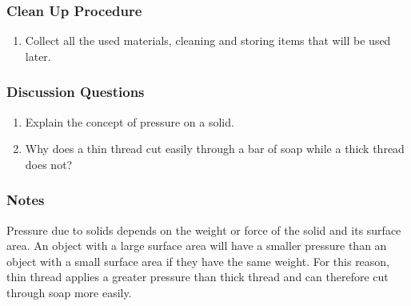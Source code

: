 \subsubsection*{Clean Up Procedure}
\begin{enumerate}
\item{Collect all the used materials, cleaning and storing items that will be used later.} 
\end{enumerate}

\subsubsection*{Discussion Questions}
\begin{enumerate}
\item{Explain the concept of pressure on a solid.} 
\item{Why does a thin thread cut easily through a bar of soap while a thick thread does not?}
\end{enumerate}

\subsubsection*{Notes}
Pressure due to solids depends on the weight or force of the solid and its surface area. An object with a large surface area will have a smaller pressure than an object with a small surface area if they have the same weight. For this reason, thin thread applies a greater pressure than thick thread and can therefore cut through soap more easily.
